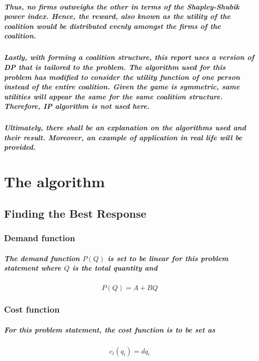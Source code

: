 \documentclass[11pt]{report}
\begin{document}
\paragraph{Thus, no firms outweighs the other in terms of the Shapley-Shubik power index. Hence, the reward, also known as the utility of the coalition would be distributed evenly amongst the firms of the coalition. }
\paragraph{Lastly, with forming a coalition structure, this report uses a version of DP that is tailored to the problem. The algorithm used for this problem has modified to consider the utility function of one person instead of the entire coalition. Given the game is symmetric, same utilities will appear the same for the same coalition structure. Therefore, IP algorithm is not used here.}
\paragraph{Ultimately, there shall be an explanation on the algorithms used and their result. Moreover, an example of application in real life will be provided.}


\chapter{The algorithm}
\section{Finding the Best Response}
\subsection{Demand function}
\paragraph{The demand function $P(Q)$ is set to be linear for this problem statement where $Q$ is the total quantity and }
\[P(Q)=A+BQ\]
\subsection{Cost function}
\paragraph{For this problem statement, the cost function is to be set as }
\[c_i(q_i) = dq_i\]
\end{document}
